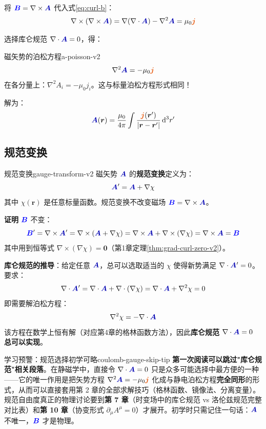 \documentclass[11pt,a4paper,openany,oneside]{book}
\newcommand{\diff}{\mathrm{d}}
\newcommand{\vecB}{\textcolor{blue}{\vect{B}}}
\newcommand{\vecJ}{\textcolor{cororange}{\vect{j}}}
\newcommand{\vecA}{\textcolor{blue!70!black}{\vect{A}}}
\newcommand{\muz}{\mu_0}
\newcommand{\vect}[1]{\bm{#1}}
\newcommand{\grad}{\nabla}
\newcommand{\curl}{\nabla\times}
\newcommand{\divg}{\nabla\cdot}
\newcommand{\lap}{\nabla^2}
\begin{document}
将 $\vecB = \curl\vecA$ 代入式\eqref{eq:curl-b}：
\[
\curl(\curl\vecA) = \grad(\divg\vecA) - \lap\vecA = \muz\vecJ
\]

选择库仑规范 $\divg\vecA = 0$，得：

\begin{theorem}{磁矢势的泊松方程}{a-poisson-v2}
\[
\lap\vecA = -\muz\vecJ
\]
在各分量上：$\lap A_i = -\muz j_i$。这与标量泊松方程形式相同！
\end{theorem}

解为：
\[
\vecA(\vect{r}) = \frac{\muz}{4\pi} \int \frac{\vecJ(\vect{r}')}{|\vect{r} - \vect{r}'|} \, \diff^3r'
\]

\subsection{规范变换}

\begin{theorem}{规范变换}{gauge-transform-v2}
磁矢势 $\vecA$ 的\textbf{规范变换}定义为：
\[
\vecA' = \vecA + \grad\chi
\]
其中 $\chi(\vect{r})$ 是任意标量函数。规范变换不改变磁场 $\vecB = \curl\vecA$。
\end{theorem}

\textbf{证明} $\vecB$ 不变：
\[
\vecB' = \curl\vecA' = \curl(\vecA + \grad\chi) = \curl\vecA + \curl(\grad\chi) = \curl\vecA = \vecB
\]
其中用到恒等式 $\curl(\grad\chi) = \vect{0}$（第1章定理\ref{thm:grad-curl-zero-v2}）。

\textbf{库仑规范的推导}：给定任意 $\vecA$，总可以选取适当的 $\chi$ 使得新势满足 $\divg\vecA' = 0$。要求：
\[
\divg\vecA' = \divg\vecA + \divg(\grad\chi) = \divg\vecA + \lap\chi = 0
\]
即需要解泊松方程：
\[
\lap\chi = -\divg\vecA
\]
该方程在数学上恒有解（对应第4章的格林函数方法），因此\textbf{库仑规范 $\divg\vecA = 0$ 总可以实现}。

\begin{tip}{学习预警：规范选择初学可略}{coulomb-gauge-skip-tip}
\textbf{第一次阅读可以跳过"库仑规范"相关段落}。在静磁学中，直接令 $\divg\vecA = 0$ 只是众多可能选择中最方便的一种——它的唯一作用是把矢势方程 $\lap\vecA = -\muz\vecJ$ 化成与静电泊松方程\textbf{完全同形}的形式，从而可以直接套用第 2 章的全部求解技巧（格林函数、镜像法、分离变量）。规范自由度真正的物理讨论要到\textbf{第 7 章}（时变场中的库仑规范 vs 洛伦兹规范完整对比表）和\textbf{第 10 章}（协变形式 $\partial_\mu A^\mu = 0$）才展开。初学时只需记住一句话：$\vecA$ 不唯一，$\vecB$ 才是物理。
\end{tip}
\end{document}
